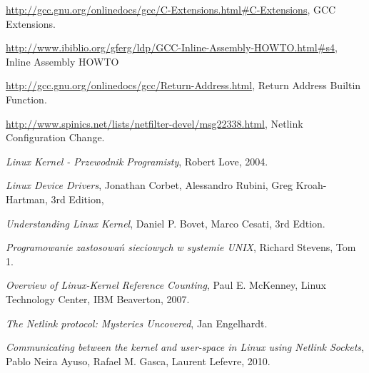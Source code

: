 \documentclass[10pt]{article}
\begin{document}
\begin{thebibliography}{99}

    \url{http://gcc.gnu.org/onlinedocs/gcc/C-Extensions.html#C-Extensions},
    GCC Extensions.

    \url{http://www.ibiblio.org/gferg/ldp/GCC-Inline-Assembly-HOWTO.html#s4},
    Inline Assembly HOWTO

    \url{http://gcc.gnu.org/onlinedocs/gcc/Return-Address.html},
    Return Address Builtin Function.

    \url{http://www.spinics.net/lists/netfilter-devel/msg22338.html},
    Netlink Configuration Change.

    \textit{Linux Kernel - Przewodnik Programisty},
    Robert Love,
    2004.

    \textit{Linux Device Drivers},
    Jonathan Corbet, Alessandro Rubini, Greg Kroah-Hartman,
    3rd Edition,

    \textit{Understanding Linux Kernel},
    Daniel P. Bovet, Marco Cesati,
    3rd Edtion.

    \textit{Programowanie zastosowań sieciowych w systemie UNIX},
    Richard Stevens,
    Tom 1.

    \textit{Overview of Linux-Kernel Reference Counting},
    Paul E. McKenney,
    Linux Technology Center,
    IBM Beaverton,
    2007.

    \textit{The Netlink protocol: Mysteries Uncovered},
    Jan Engelhardt.

    \textit{Communicating between the kernel and user-space in Linux using Netlink Sockets},
    Pablo Neira Ayuso, Rafael M. Gasca, Laurent Lefevre,
    2010.

\end{thebibliography}

\listoffigures
\end{document}
